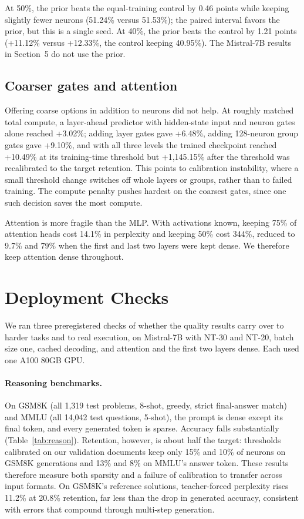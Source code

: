 \documentclass[10pt,twocolumn,letterpaper]{article}
\begin{document}
At 50\%, the prior beats the equal-training control by 0.46 points while keeping slightly fewer neurons (51.24\% versus 51.53\%); the paired interval favors the prior, but this is a single seed. At 40\%, the prior beats the control by 1.21 points (+11.12\% versus +12.33\%, the control keeping 40.95\%). The Mistral-7B results in Section~5 do not use the prior.

\subsection{Coarser gates and attention}
\label{sec:coarse}

Offering coarse options in addition to neurons did not help. At roughly matched total compute, a layer-ahead predictor with hidden-state input and neuron gates alone reached +3.02\%; adding layer gates gave +6.48\%, adding 128-neuron group gates gave +9.10\%, and with all three levels the trained checkpoint reached +10.49\% at its training-time threshold but +1,145.15\% after the threshold was recalibrated to the target retention. This points to calibration instability, where a small threshold change switches off whole layers or groups, rather than to failed training. The compute penalty pushes hardest on the coarsest gates, since one such decision saves the most compute.

Attention is more fragile than the MLP. With activations known, keeping 75\% of attention heads cost 14.1\% in perplexity and keeping 50\% cost 344\%, reduced to 9.7\% and 79\% when the first and last two layers were kept dense. We therefore keep attention dense throughout.

\section{Deployment Checks}
\label{sec:deploy}

We ran three preregistered checks of whether the quality results carry over to harder tasks and to real execution, on Mistral-7B with NT-30 and NT-20, batch size one, cached decoding, and attention and the first two layers dense. Each used one A100 80GB GPU.

\paragraph{Reasoning benchmarks.} On GSM8K (all 1,319 test problems, 8-shot, greedy, strict final-answer match) and MMLU (all 14,042 test questions, 5-shot), the prompt is dense except its final token, and every generated token is sparse. Accuracy falls substantially (Table~\ref{tab:reason}). Retention, however, is about half the target: thresholds calibrated on our validation documents keep only 15\% and 10\% of neurons on GSM8K generations and 13\% and 8\% on MMLU's answer token. These results therefore measure both sparsity and a failure of calibration to transfer across input formats. On GSM8K's reference solutions, teacher-forced perplexity rises 11.2\% at 20.8\% retention, far less than the drop in generated accuracy, consistent with errors that compound through multi-step generation.
\end{document}
